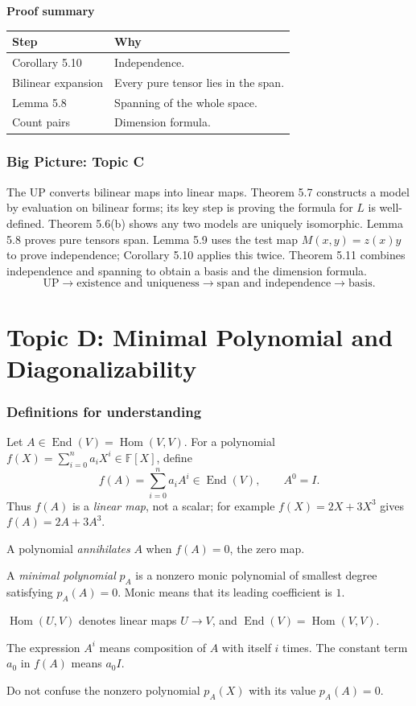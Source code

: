 \documentclass[11pt,a4paper]{article}
\newcommand{\F}{\mathbb F}
\newcommand{\prooftable}[1]{\medskip\textbf{Proof summary}\par\smallskip #1\medskip}
\begin{document}
\prooftable{\begin{tabularx}{\linewidth}{@{}p{.28\linewidth}X@{}}\hline
Step & Why\\\hline
Corollary 5.10 & Independence.\\
Bilinear expansion & Every pure tensor lies in the span.\\
Lemma 5.8 & Spanning of the whole space.\\
Count pairs & Dimension formula.\\\hline
\end{tabularx}}

\section*{Big Picture: Topic C}
The UP converts bilinear maps into linear maps. Theorem 5.7 constructs a model by evaluation on bilinear forms; its key step is proving the formula for \(L\) is well-defined. Theorem 5.6(b) shows any two models are uniquely isomorphic. Lemma 5.8 proves pure tensors span. Lemma 5.9 uses the test map \(M(x,y)=z(x)y\) to prove independence; Corollary 5.10 applies this twice. Theorem 5.11 combines independence and spanning to obtain a basis and the dimension formula.
\[
\boxed{\text{UP}\longrightarrow\text{existence and uniqueness}
\longrightarrow\text{span and independence}
\longrightarrow\text{basis}.}
\]


\clearpage
\part*{Topic D: Minimal Polynomial and Diagonalizability}

\section*{Definitions for understanding}
Let \(A\in\operatorname{End}(V)=\operatorname{Hom}(V,V)\). For a polynomial
\(f(X)=\sum_{i=0}^n a_iX^i\in\F[X]\), define
\[
f(A)=\sum_{i=0}^n a_iA^i\in\operatorname{End}(V),\qquad A^0=I.
\]
Thus \(f(A)\) is a \emph{linear map}, not a scalar; for example
\(f(X)=2X+3X^3\) gives \(f(A)=2A+3A^3\).

A polynomial \emph{annihilates} \(A\) when \(f(A)=0\), the zero map.

A \emph{minimal polynomial} \(p_A\) is a nonzero monic polynomial of smallest
degree satisfying \(p_A(A)=0\). Monic means that its leading coefficient is \(1\).

\begin{personalnote}[title=Definitions for understanding]
\(\operatorname{Hom}(U,V)\) denotes linear maps \(U\to V\), and
\(\operatorname{End}(V)=\operatorname{Hom}(V,V)\).

The expression \(A^i\) means composition of \(A\) with itself \(i\) times.
The constant term \(a_0\) in \(f(A)\) means \(a_0I\).

Do not confuse the nonzero polynomial \(p_A(X)\) with its value \(p_A(A)=0\).
\end{personalnote}
\end{document}
